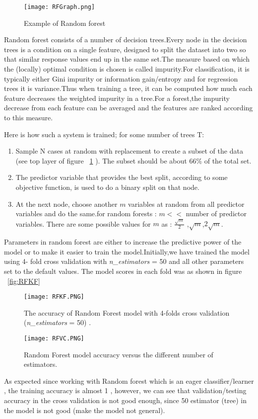 \documentclass{article}
\begin{document}
\begin{figure}[H]
	\centering		
	\texttt{[image: RFGraph.png]}\caption{\footnotesize Example of Random forest}
	\label{fig:RFGraph}	
	
\end{figure} 
Random forest consists of a number of decision trees.Every node in the decision trees is a condition on a single feature, designed to split the dataset into two so that similar response values end up in the same set.The measure based on which the (locally) optimal condition is chosen is called impurity.For classification, it is typically either Gini impurity or information gain/entropy and for regression trees it is variance.Thus when training a tree, it can be computed how much each feature decreases the weighted impurity in a tree.For a forest,the impurity decrease from each feature can be averaged and the features are ranked according to this measure.

Here is how such a system is trained; for some number of trees T:
\begin{enumerate}
	\item Sample N cases at random with replacement to create a subset of the data (see top layer of figure ~\ref {fig:RFGraph} ). The subset should be about 66\% of the total set.
	\item The predictor variable that provides the best split, according to some objective function, is used to do a binary split on that node.
	\item At the next node, choose another $m$ variables at random from all predictor variables and do the same.for random forests : $m <<$ number of predictor variables. There are some possible values for $m$ as : $\frac{\sqrt{m}}{2}$ ,$\sqrt{m}$,$2 \sqrt{m}$.
\end{enumerate}
Parameters in random forest are either to increase the predictive power of the model or to make it easier to train the model.Initially,we have trained the model using 4- fold cross validation with \textit{n\_estimators} = 50 and all other parameters set to the default values. The model scores in each fold was as shown in figure ~\ref{fig:RFKF}
\begin{figure}[H]
	\centering
	\begin{minipage}{0.45\textwidth}
		\centering
		\texttt{[image: RFKF.PNG]}\caption{{\small The accuracy of Random Forest model with 4-folds cross validation (\textit{n\_estimators} = 50) .}}
		\label{fig:RFKF}
	\end{minipage}\hfill
	\begin{minipage}{0.45\textwidth}
		\centering
		\texttt{[image: RFVC.PNG]}\caption{{\small Random Forest model accuracy versus the different number of estimators. }}
		\label{fig:RFVC}
	\end{minipage}
\end{figure}
As expected since working with Random forest which is an eager classifier/learner , the training accuracy is almost 1 , however, we can see that validation/testing accuracy in the cross validation is not good enough, since 50 estimator (tree) in the model is not good (make the model not general). 
\end{document}
